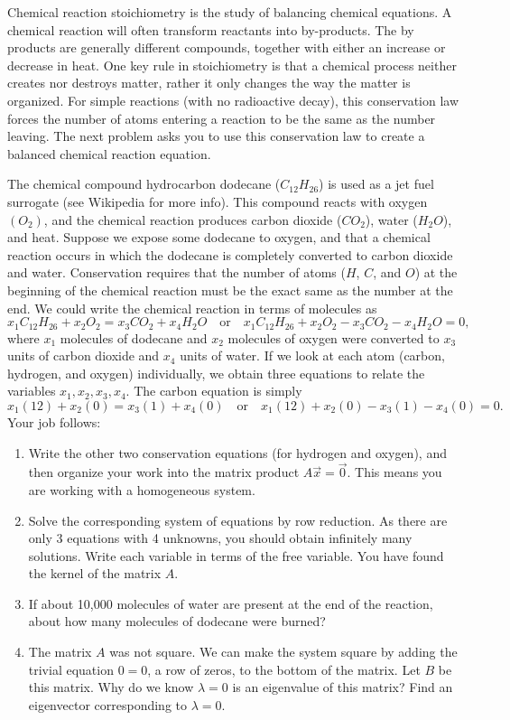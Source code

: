 Chemical reaction stoichiometry is the study of balancing chemical equations. A chemical reaction will often transform reactants into by-products. The by products are generally different compounds, together with either an increase or decrease in heat. One key rule in stoichiometry is that a chemical process neither creates nor destroys matter, rather it only changes the way the matter is organized. For simple reactions (with no radioactive decay), this conservation law forces the number of atoms entering a reaction to be the same as the number leaving. The next problem asks you to use this conservation law to create a balanced chemical reaction equation. 
\begin{problem}[Stoichiometry]
 The chemical compound hydrocarbon dodecane ($C_{12}H_{26}$) is used as a jet fuel surrogate (see Wikipedia for more info).  This compound reacts with oxygen $(O_2)$, and the chemical reaction produces carbon dioxide ($CO_2$), water ($H_2 O$), and heat.  Suppose we expose some dodecane to oxygen, and that a chemical reaction occurs in which the dodecane is completely converted to carbon dioxide and water.  
 Conservation requires that the number of atoms ($H$, $C$, and $O$) at the beginning of the chemical reaction must be the exact same as the number at the end. 
 We could write the chemical reaction in terms of molecules as
 $$x_1 C_{12}H_{26} +x_2 O_2 = x_3 CO_2+ x_4 H_2O\quad \text{or} \quad x_1 C_{12}H_{26} +x_2 O_2 - x_3 CO_2- x_4 H_2O=0, $$
 where $x_1$ molecules of dodecane and $x_2$ molecules of oxygen were converted to $x_3$ units of carbon dioxide and $x_4$ units of water.  
 If we look at each atom (carbon, hydrogen, and oxygen) individually, we obtain three equations to relate the variables $x_1, x_2, x_3, x_4$.  The carbon equation is simply
 $$x_1(12) + x_2(0) = x_3(1)+x_4(0) \quad \text{or}\quad x_1(12) + x_2(0) - x_3(1)-x_4(0)=0.$$  
 Your job follows:
\begin{enumerate}
 \item Write the other two conservation equations (for hydrogen and oxygen), and then organize your work into the matrix product $A\vec x = \vec 0$. This means you are working with a homogeneous system.
 \item Solve the corresponding system of equations by row reduction.  As there are only 3 equations with 4 unknowns, you should obtain infinitely many solutions. Write each variable in terms of the free variable.  You have found the kernel of the matrix $A$. 
 \item If about 10,000 molecules of water are present at the end of the reaction, about how many molecules of dodecane were burned? 
 \item 
{}%
The matrix $A$ was not square.  We can make the system square by adding the trivial equation $0=0$, a row of zeros, to the bottom of the matrix. Let $B$ be this matrix. Why do we know $\lambda=0$ is an eigenvalue of this matrix?  Find an eigenvector corresponding to $\lambda=0$. 
\end{enumerate}
\end{problem}

